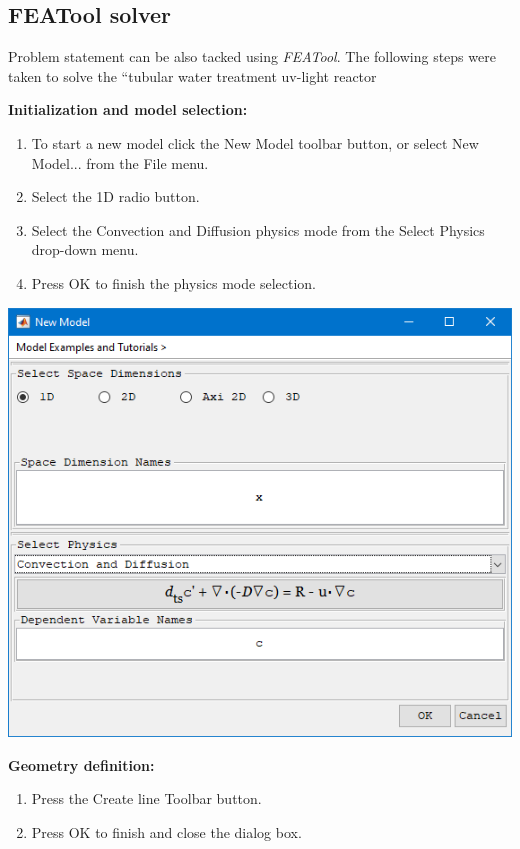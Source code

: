 \documentclass{article}
\begin{document}
\subsection{FEATool solver}

Problem statement can be also tacked using \emph{FEATool}. The following steps were taken to solve the ``tubular water treatment uv-light reactor

\textbf{Initialization and model selection:}
\begin{enumerate}
\item To start a new model click the New Model toolbar button, or select New Model... from the File menu.
\item Select the 1D radio button.
\item Select the Convection and Diffusion physics mode from the Select Physics drop-down menu.
\item Press OK to finish the physics mode selection.
\end{enumerate}

\begin{center}
\includegraphics[scale=0.60]{./matlab/FEATool_steps/initializationAndModelSelection.png}
\end{center}

\textbf{Geometry definition:}
\begin{enumerate}[resume]
\item Press the Create line Toolbar button.
\item Press OK to finish and close the dialog box.
\end{enumerate}
\end{document}
